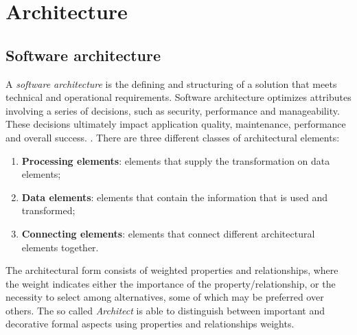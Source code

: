 \documentclass[\main/main.tex]{subfiles}
\begin{document}
\chapter{Architecture}

\section{Software architecture}
A \emph{software architecture} is the defining and structuring of a solution that meets technical and operational requirements. Software architecture optimizes attributes involving a series of decisions, such as security, performance and manageability. These decisions ultimately impact application quality, maintenance, performance and overall success. \cite{Perry1992FoundationsFT}. There are three different classes of architectural elements: 
\begin{enumerate}
    \item \textbf{Processing elements}: elements that supply the transformation on data elements;
    \item \textbf{Data elements}: elements that contain the information that is used and transformed;
    \item \textbf{Connecting elements}: elements that connect different architectural elements together.
\end{enumerate}
The architectural form consists of weighted properties and relationships, where the weight indicates either the importance of the property/relationship, or the necessity to select among alternatives, some of which may be preferred over others. The so called \emph{Architect} is able to distinguish between important and decorative formal aspects using properties and relationships weights.
\end{document}
